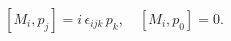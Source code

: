 \begin{equation}\label{d}
 [M_i, p_j] = i\, \epsilon_{ijk}\, p_k, \quad [M_i, p_0] = 0.
\end{equation}

